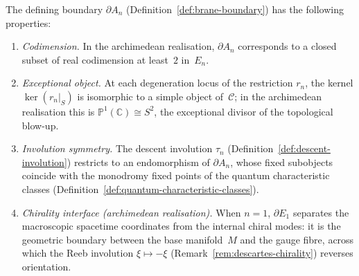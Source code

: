 \begin{proposition}
\label{prop:brane-boundary}
The defining boundary $\partial A_n$
(Definition~\ref{def:brane-boundary}) has the following properties:
\begin{enumerate}
  \item \emph{Codimension.}\; In the archimedean realisation,
        $\partial A_n$ corresponds to a closed subset of real codimension at
        least~$2$ in~$E_n$.
  \item \emph{Exceptional object.}\; At each degeneration locus of the
        restriction $r_n$, the kernel $\ker(r_n|_S)$ is isomorphic to a
        simple object of~$\mathcal{C}$; in the archimedean realisation
        this is $\mathbb{P}^1(\mathbb{C}) \cong S^2$, the exceptional divisor of the
        topological blow-up.
  \item \emph{Involution symmetry.}\; The descent involution $\tau_n$
        (Definition~\ref{def:descent-involution}) restricts to an
        endomorphism of $\partial A_n$, whose fixed subobjects coincide
        with the monodromy fixed points of the quantum characteristic
        classes (Definition~\ref{def:quantum-characteristic-classes}).
  \item \emph{Chirality interface (archimedean realisation).}\;
        When $n = 1$, $\partial E_1$ separates the macroscopic spacetime
        coordinates from the internal chiral modes: it is the geometric
        boundary between the base manifold~$M$ and the gauge fibre, across
        which the Reeb involution $\xi \mapsto -\xi$
        (Remark~\ref{rem:descartes-chirality}) reverses orientation.
\end{enumerate}
\end{proposition}


